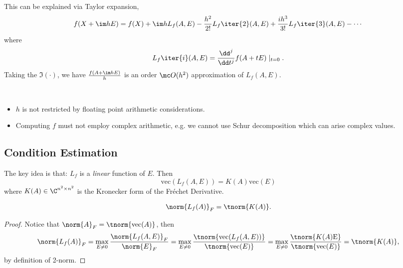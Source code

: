\documentclass{article}
\def\FD{Fr\'echet Derivative}
\begin{document}
This can be explained via Taylor expansion, 
\begin{equation}\notag
    f(X + \im hE) = f(X) + \im hL_f(A,E) - \frac{h^2}{2!}L_f\iter{2}(A,E) + \frac{ih^3}{3!}L_f\iter{3}(A,E) - \cdots
\end{equation}
where 
\begin{equation}\notag
    L_f\iter{i}(A,E) = \frac{\dd^j}{\dd t^j}f(A + tE)\mid_{t=0}.
\end{equation}
Taking the $\Im(\cdot)$, we have $\frac{f(A + \im hE)}{h}$ is an order
$\mc O(h^2)$ approximation of $L_f(A,E)$.
\begin{remark}
    \ 
    \begin{itemize}
        \item $h$ is not restricted by floating point arithmetic
        considerations.
        \item Computing $f$ must not employ complex arithmetic, e.g. we
        cannot use Schur decomposition which can arise complex values.
    \end{itemize}
\end{remark}

\subsection{Condition Estimation}
The key idea is that: $L_f$ is a \emph{linear} function of $E$. Then 
\begin{equation}\label{eq.vecandFD}
    \mathrm{vec}(L_f(A,E)) = K(A)\mathrm{vec}(E)
\end{equation}
where $K(A) \in\C^{n^2 \times n^2}$ is the Kronecker form of the \FD.

\begin{lemma}
    \begin{equation}\notag
        \norm{L_f(A)}_F = \tnorm{K(A)}.
    \end{equation}
\end{lemma}
\begin{proof}
    Notice that $\norm{A}_F = \tnorm{\mathrm{vec}(A)}$, then 
    \begin{equation}\notag
        \norm{L_f(A)}_F = \max_{E\neq 0} \frac{\norm{L_f(A,E)}_F}{\norm{E}_F} = \max_{E\neq 0} \frac{\tnorm{\mathrm{vec}(L_f(A,E))}}{\tnorm{\mathrm{vec}(E)}} = \max_{E\neq 0} \frac{\tnorm{K(A)\mathrm{E}}}{\tnorm{\mathrm{vec}(E)}}  = \tnorm{K(A)},
    \end{equation}
    by definition of 2-norm.
\end{proof}
\end{document}
